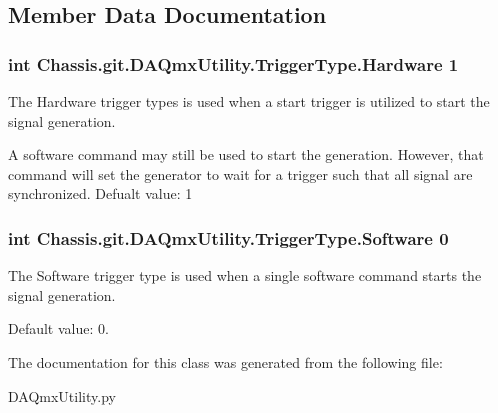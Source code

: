 \subsection{Member Data Documentation}
\hypertarget{class_chassis_8git_1_1_d_a_qmx_utility_1_1_trigger_type_a4c2b5b5bf6e533b796d4e700e34f3c46}{
\subsubsection[{Hardware}]{\setlength{\rightskip}{0pt plus 5cm}int Chassis.\-git.\-D\-A\-Qmx\-Utility.\-Trigger\-Type.\-Hardware 1\hspace{0.3cm}{\ttfamily [static]}}}\label{class_chassis_8git_1_1_d_a_qmx_utility_1_1_trigger_type_a4c2b5b5bf6e533b796d4e700e34f3c46}


The Hardware trigger types is used when a start trigger is utilized to start the signal generation. 

A software command may still be used to start the generation. However, that command will set the generator to wait for a trigger such that all signal are synchronized. Defualt value\-: 1 \hypertarget{class_chassis_8git_1_1_d_a_qmx_utility_1_1_trigger_type_a1bd6ba4aae43fbd2e43a7ff79f6adb23}{
\subsubsection[{Software}]{\setlength{\rightskip}{0pt plus 5cm}int Chassis.\-git.\-D\-A\-Qmx\-Utility.\-Trigger\-Type.\-Software 0\hspace{0.3cm}{\ttfamily [static]}}}\label{class_chassis_8git_1_1_d_a_qmx_utility_1_1_trigger_type_a1bd6ba4aae43fbd2e43a7ff79f6adb23}


The Software trigger type is used when a single software command starts the signal generation. 

Default value\-: 0. 

The documentation for this class was generated from the following file\-:\begin{DoxyCompactItemize}
\item 
D\-A\-Qmx\-Utility.\-py\end{DoxyCompactItemize}
